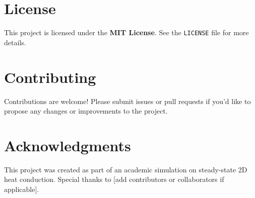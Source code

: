 \documentclass{article}
\begin{document}
\section*{License}
This project is licensed under the \textbf{MIT License}. See the \texttt{LICENSE} file for more details.

\section*{Contributing}
Contributions are welcome! Please submit issues or pull requests if you'd like to propose any changes or improvements to the project.

\section*{Acknowledgments}
This project was created as part of an academic simulation on steady-state 2D heat conduction. Special thanks to [add contributors or collaborators if applicable].
\end{document}
